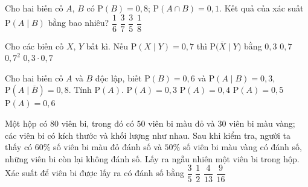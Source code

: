 \documentclass[12pt,a4paper]{article}
\begin{document}
\begin{ex}%
 Cho hai biến cố $A$, $B$ có $\mathrm{P}(B)=0{,}8$; $\mathrm{P}(A\cap B)=0{,}1$. Kết quả của xác suất $\mathrm{P}(A\mid B)$ bằng bao nhiêu?
 \choice
 {$\dfrac{1}{6}$}
 {$\dfrac{3}{7}$}
 {$\dfrac{3}{5}$}
 {\True $\dfrac{1}{8}$}
\end{ex}

\begin{ex}%
	Cho các biến cố $X$, $Y$ bất kì. Nếu $\mathrm{P} (X\mid Y)=0{,}7$ thì $\mathrm{P} \big(\overline{X} \mid Y\big)$ bằng
	\choice
	{\True $0{,}3$}
	{$0{,}7$}
	{$0{,}7^2$}
	{$0{,}3\cdot 0{,}7$}
\end{ex}

\begin{ex}%
 Cho hai biến cố $A$ và $B$ độc lập, biết $\mathrm{P}(B)=0{,}6$ và $\mathrm{P}(A\mid B)=0{,}3$, $\mathrm{P} \left(A\mid \overline{B} \right)=0{,}8$. Tính $\mathrm{P}(A)$.
 \choice
 {$\mathrm{P}(A)=0{,}3$}
 {$\mathrm{P}(A)=0{,}4$} 
 {\True $\mathrm{P}(A)=0{,}5$} 
 {$\mathrm{P}(A)=0{,}6$}
\end{ex}

\begin{ex}%
 Một hộp có $80$ viên bi, trong đó có $50$ viên bi màu đỏ và $30$ viên bi màu vàng; các viên bi có kích thước và khối lượng như nhau. Sau khi kiểm tra, người ta thấy có $60 \%$ số viên bi
 màu đỏ đánh số và $50 \%$ số viên bi màu vàng có đánh số, những viên bi còn lại không đánh số. Lấy ra ngẫu nhiên một viên bi trong hộp. Xác suất để viên bi được lấy ra có đánh số bằng
 \choice 
 {$\dfrac{3}{5}$}
 {$\dfrac{1}{2}$}
 {$\dfrac{4}{13}$}
 {\True $\dfrac{9}{16}$}
\end{ex}
\vspace{0.5cm}
\end{document}
